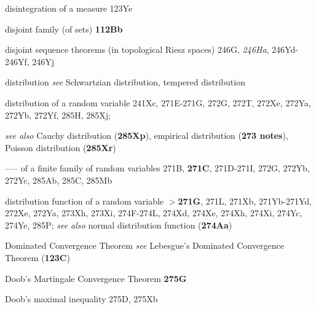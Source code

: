 disintegration of a measure 123Ye


disjoint family (of sets) {\bf 112Bb}



disjoint sequence theorems (in topological Riesz spaces) 246G,
{\it 246Ha}, 246Yd-246Yf, 
246Yj






distribution {\it see} Schwartzian distribution, tempered distribution


distribution of a random variable 241Xc,
271E-271G, 
272G, 272T, 272Xe, 272Ya, 272Yb, 272Yf, 285H, 285Xj;  
   
  {\it see also} Cauchy distribution ({\bf 285Xp}),
empirical distribution ({\bf 273 notes}), 
Poisson distribution ({\bf 285Xr})


----- of a finite family of random variables  271B, {\bf 271C},
271D-271I, 
272G, 272Yb, 272Yc, 285Ab, 285C, 285Mb




distribution function of a random variable {\bf $\pmb{>}$271G}, 271L,
271Xb, 271Yb-271Yd, 
272Xe, 272Ya, 273Xh, 273Xi,
274F-274L, 
274Xd, 274Xe, 274Xh, 274Xi, 274Yc, 274Ye, 285P; 
  {\it see also} normal distribution function ({\bf 274Aa})






















Dominated Convergence Theorem {\it see} Lebesgue's Dominated Convergence
Theorem ({\bf 123C})




Doob's Martingale Convergence Theorem {\bf 275G}


Doob's maximal inequality 275D, 275Xb


























